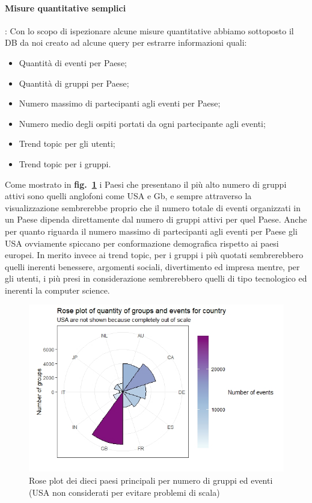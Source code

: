 \documentclass[fleqn,10pt]{SelfArx} %
\begin{document}
{\paragraph{Misure quantitative semplici}:
Con lo scopo di ispezionare alcune misure quantitative abbiamo sottoposto il DB da noi creato ad alcune query per estrarre informazioni quali:
\begin{itemize}[noitemsep]
\item Quantità di eventi per Paese;
\item Quantità di gruppi per Paese;
\item Numero massimo di partecipanti agli eventi per Paese;
\item Numero medio degli ospiti portati da ogni partecipante agli eventi;
\item Trend topic per gli utenti;
\item Trend topic per i gruppi.
\end{itemize}
Come mostrato in \textbf{fig.~\ref{rose_plot}} i Paesi che presentano il più alto numero di gruppi attivi sono quelli anglofoni come USA e Gb, e sempre attraverso la visualizzazione sembrerebbe proprio che il numero totale di eventi organizzati in un Paese dipenda direttamente dal numero di gruppi attivi per quel Paese.
Anche per quanto riguarda il numero massimo di partecipanti agli eventi per Paese gli USA ovviamente spiccano per conformazione demografica rispetto ai paesi europei.
In merito invece ai trend topic, per i gruppi i più quotati sembrerebbero quelli inerenti benessere, argomenti sociali, divertimento ed impresa mentre, per gli utenti, i più presi in considerazione sembrerebbero quelli di tipo tecnologico ed inerenti la computer science.
\begin{figure}
\centering
\includegraphics[width = 9.2 cm, height = 5 cm]{rose_plot_quantitative.jpeg}
\caption{\label{rose_plot} Rose plot dei dieci paesi principali per numero di gruppi ed eventi (USA non considerati per evitare problemi di scala)}
\end{figure}
}
\end{document}
